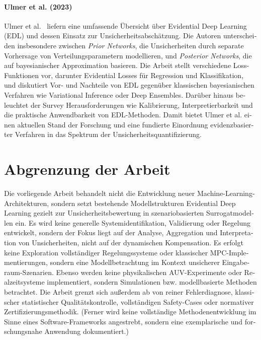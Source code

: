 

\begin{otherlanguage}{ngerman}

\paragraph{Ulmer et al. (2023)}
Ulmer et al.~\parencite{Ulmer2023} liefern eine umfassende Übersicht über Evidential Deep Learning (EDL) und dessen Einsatz zur Unsicherheitsabschätzung. Die Autoren unterscheiden insbesondere zwischen \emph{Prior Networks}, die Unsicherheiten durch separate Vorhersage von Verteilungsparametern modellieren, und \emph{Posterior Networks}, die auf bayesianischer Approximation basieren. Die Arbeit stellt verschiedene Loss-Funktionen vor, darunter Evidential Losses für Regression und Klassifikation, und diskutiert Vor- und Nachteile von EDL gegenüber klassischen bayesianischen Verfahren wie Variational Inference oder Deep Ensembles. Darüber hinaus beleuchtet der Survey Herausforderungen wie Kalibrierung, Interpretierbarkeit und die praktische Anwendbarkeit von EDL-Methoden. Damit bietet Ulmer et al. einen aktuellen Stand der Forschung und eine fundierte Einordnung evidenzbasierter Verfahren in das Spektrum der Unsicherheitsquantifizierung. 

\section{Abgrenzung der Arbeit}

Die vorliegende Arbeit behandelt nicht die Entwicklung neuer Machine-Learning-Architekturen, sondern setzt bestehende Modellstrukturen Evidential Deep Learning gezielt zur Unsicherheitsbewertung in szenariobasierten Surrogatmodellen ein. Es wird keine generelle Systemidentifikation, Validierung oder Regelung entwickelt, sondern der Fokus liegt auf der Analyse, Aggregation und Interpretation von Unsicherheiten, nicht auf der dynamischen Kompensation.
Es erfolgt keine Exploration vollständiger Regelungssysteme oder klassischer MPC-Implementierungen, sondern eine Modellbetrachtung im Kontext unsicherer Eingaberaum-Szenarien. Ebenso werden keine physikalischen AUV-Experimente oder Realzeitsysteme implementiert, sondern Simulationen bzw. modellbasierte Methoden betrachtet. Die Arbeit grenzt sich außerdem ab von reiner Fehlerdiagnose, klassischer statistischer Qualitätskontrolle, vollständigen Safety-Cases oder normativer Zertifizierungsmethodik. (Ferner wird keine vollständige Methodenentwicklung im Sinne eines Software-Frameworks angestrebt, sondern eine exemplarische und forschungsnahe Anwendung dokumentiert.)

\end{otherlanguage}
